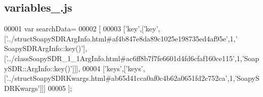 \subsection{variables\+\_.\+js}
\label{variables__1_8js_source}

\begin{DoxyCode}
00001 var searchData=
00002 [
00003   [\textcolor{stringliteral}{'key'},[\textcolor{stringliteral}{'key'},[\textcolor{stringliteral}{'../structSoapySDRArgInfo.html#af4b847e8da89c1025e198735ed4af95e'},1,\textcolor{stringliteral}{'
      SoapySDRArgInfo::key()'}],[\textcolor{stringliteral}{'../classSoapySDR\_1\_1ArgInfo.html#ac6ff8b7f7fe6601d4fd6cfaf160ce115'},1,\textcolor{stringliteral}{'SoapySDR::ArgInfo::key()'}]]],
00004   [\textcolor{stringliteral}{'keys'},[\textcolor{stringliteral}{'keys'},[\textcolor{stringliteral}{'../structSoapySDRKwargs.html#ab65d41cca0af0c4b62a0651fd2c752ca'},1,\textcolor{stringliteral}{'SoapySDRKwargs'}]]]
00005 ];
\end{DoxyCode}
